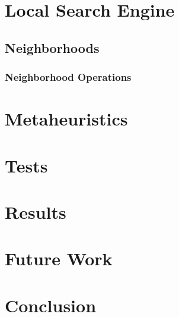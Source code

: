 \documentclass[a4paper,11pt]{article}
\begin{document}
\section{Local Search Engine} \label{sec_local}
  
  \subsection{Neighborhoods}
    \subsubsection{Neighborhood Operations}
\section{Metaheuristics}
\section{Tests}
\section{Results}
\section{Future Work}
  
\section{Conclusion}
\end{document}
